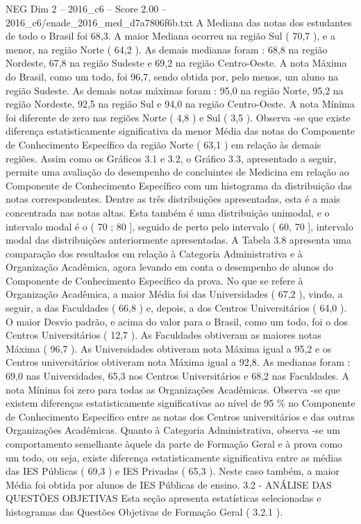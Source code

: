 \begin{textsample}{NEG Dim 2 – 2016\_c6 – Score 2.00 – 2016\_c6/enade\_2016\_med\_d7a7806f6b.txt}
A Mediana das notas dos estudantes de todo o Brasil foi 68,3.
A maior Mediana ocorreu na região Sul ( 70,7 ), e a menor, na região Norte ( 64,2 ).
As demais medianas foram : 68,8 na região Nordeste, 67,8 na região Sudeste e 69,2 na região Centro-Oeste.
A nota Máxima do Brasil, como um todo, foi 96,7, sendo obtida por, pelo menos, um aluno na região Sudeste.
As demais notas máximas foram : 95,0 na região Norte, 95,2 na região Nordeste, 92,5 na região Sul e 94,0 na região Centro-Oeste.
A nota Mínima foi diferente de zero nas regiões Norte ( 4,8 ) e Sul ( 3,5 ).
Observa -se que existe diferença estatisticamente significativa da menor Média das notas do Componente de Conhecimento Específico da região Norte ( 63,1 ) em relação às demais regiões.
Assim como os Gráficos 3.1 e 3.2, o Gráfico 3.3, apresentado a seguir, permite uma avaliação do desempenho de concluintes de Medicina em relação ao Componente de Conhecimento Específico com um histograma da distribuição das notas correspondentes.
Dentre as três distribuições apresentadas, esta é a mais concentrada nas notas altas.
Esta também é uma distribuição unimodal, e o intervalo modal é o ( 70 ; 80 ], seguido de perto pelo intervalo ( 60, 70 ], intervalo modal das distribuições anteriormente apresentadas.
A Tabela 3.8 apresenta uma comparação dos resultados em relação à Categoria Administrativa e à Organização Acadêmica, agora levando em conta o desempenho de alunos do Componente de Conhecimento Específico da prova.
No que se refere à Organização Acadêmica, a maior Média foi das Universidades ( 67,2 ), vindo, a seguir, a das Faculdades ( 66,8 ) e, depois, a dos Centros Universitários ( 64,0 ).
O maior Desvio padrão, e acima do valor para o Brasil, como um todo, foi o dos Centros Universitários ( 12,7 ).
As Faculdades obtiveram as maiores notas Máxima ( 96,7 ).
As Universidades obtiveram nota Máxima igual a 95,2 e os Centros universitários obtiveram nota Máxima igual a 92,8.
As medianas foram : 69,0 nas Universidades, 65,3 nos Centros Universitários e 68,2 nas Faculdades.
A nota Mínima foi zero para todas as Organizações Acadêmicas.
Observa -se que existem diferenças estatisticamente significativas ao nível de 95 \% no Componente de Conhecimento Específico entre as notas dos Centros universitários e das outras Organizações Acadêmicas.
Quanto à Categoria Administrativa, observa -se um comportamento semelhante àquele da parte de Formação Geral e à prova como um todo, ou seja, existe diferença estatisticamente significativa entre as médias das IES Públicas ( 69,3 ) e IES Privadas ( 65,3 ).
Neste caso também, a maior Média foi obtida por alunos de IES Públicas de ensino. 3.2 - ANÁLISE DAS QUESTÕES OBJETIVAS Esta seção apresenta estatísticas selecionadas e histogramas das Questões Objetivas de Formação Geral ( 3.2.1 ).

\end{textsample}
